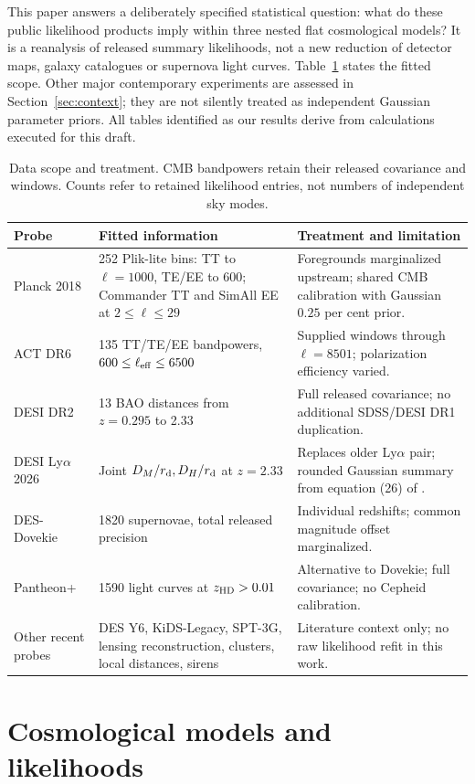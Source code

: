 \documentclass[fleqn,usenatbib]{mnras}
\newcommand{\rd}{r_{\rm d}}
\begin{document}
This paper answers a deliberately specified statistical question: what do these
public likelihood products imply within three nested flat cosmological models?
It is a reanalysis of released summary likelihoods, not a new reduction of
detector maps, galaxy catalogues or supernova light curves. Table~\ref{tab:data}
states the fitted scope. Other major contemporary experiments are assessed in
Section~\ref{sec:context}; they are not silently treated as independent Gaussian
parameter priors. All tables identified as our results derive from calculations
executed for this draft.

\begin{table}
\centering
\caption{Data scope and treatment. CMB bandpowers retain their released covariance and windows. Counts refer to retained likelihood entries, not numbers of independent sky modes.}
\label{tab:data}
\begin{tabular}{p{}p{}p{}}
\toprule
Probe & Fitted information & Treatment and limitation\\
\midrule
Planck 2018 & 252 Plik-lite bins: TT to $\ell=1000$, TE/EE to 600; Commander TT and SimAll EE at $2\leq\ell\leq29$ & Foregrounds marginalized upstream; shared CMB calibration with Gaussian $0.25$ per cent prior.\\
ACT DR6 & 135 TT/TE/EE bandpowers, $600\leq\ell_{\rm eff}\leq6500$ & Supplied windows through $\ell=8501$; polarization efficiency varied.\\
DESI DR2 & 13 BAO distances from $z=0.295$ to 2.33 & Full released covariance; no additional SDSS/DESI DR1 duplication.\\
DESI Ly$\alpha$ 2026 & Joint $D_M/\rd,D_H/\rd$ at $z=2.33$ & Replaces older Ly$\alpha$ pair; rounded Gaussian summary from equation (26) of \citet{DESI2026}.\\
DES-Dovekie & 1820 supernovae, total released precision & Individual redshifts; common magnitude offset marginalized.\\
Pantheon+ & 1590 light curves at $z_{\rm HD}>0.01$ & Alternative to Dovekie; full covariance; no Cepheid calibration.\\
Other recent probes & DES Y6, KiDS-Legacy, SPT-3G, lensing reconstruction, clusters, local distances, sirens & Literature context only; no raw likelihood refit in this work.\\
\bottomrule
\end{tabular}
\end{table}

\section{Cosmological models and likelihoods}
\end{document}
